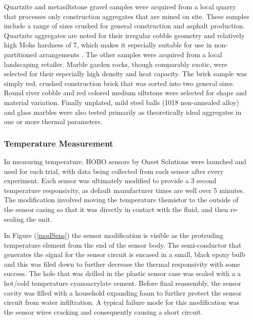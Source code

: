 \documentclass[12pt]{article}
\numberwithin{equation}{section}
\numberwithin{table}{section}
\numberwithin{figure}{section}
\begin{document}
Quartzite and metasiltstone gravel samples were acquired from a local quarry that processes only construction aggregates that are mined on site. These samples include a range of sizes crushed for general construction and asphalt production. Quartzite aggregates are noted for their irregular cobble geometry and relatively high Mohs hardness of 7, which makes it especially suitable for use in non-partitioned arrangements \citeauthor*{ballast}. The other samples were acquired from a local landscaping retailer. Marble garden rocks, though comparably exotic, were selected for their especially high density and heat capacity. The brick sample was simply red, crushed construction brick that was sorted into two general sizes. Round river cobble and red colored medium siltstone were selected for shape and material variation. Finally unplated, mild steel balls (1018 non-annealed alloy) and glass marbles were also tested primarily as theoretically ideal aggregates in one or more thermal parameters.

\subsubsection{Temperature Measurement}
In measuring temperature, HOBO sensors by Onset Solutions were launched and used for each trial, with data being collected from each sensor after every experiment. Each sensor was ultimately modified to provide a 3 second temperature responsivity, as default manufacturer times are well over 5 minutes. The modification involved moving the temperature themistor to the outside of the sensor casing so that it was directly in contact with the fluid, and then re-sealing the unit. 

In Figure (\ref{modSens}) the sensor modification is visible as the protruding temperature element from the end of the sensor body. The semi-conductor that generates the signal for the sensor circuit is encased in a small, black epoxy bulb and this was filed down to further decrease the thermal responsivity with some success. The hole that was drilled in the plastic sensor case was sealed with a a hot/cold temperature cyanoacrylate cement. Before final reassembly, the sensor cavity was filled with a household expanding foam to further protect the sensor circuit from water infiltration. A typical failure mode for this modification was the sensor wires cracking and consequently causing a short circuit. 
\end{document}
